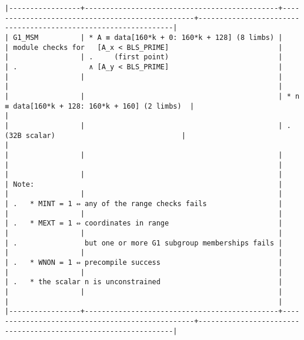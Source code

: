 \documentclass[varwidth=\maxdimen,margin=0.5cm,multi={verbatim}]{standalone}
\begin{document}
\begin{verbatim}
|-----------------+----------------------------------------------+-------------------------------------------------+----------------------------------------------------------------|
| G1_MSM          | * A ≡ data[160*k + 0: 160*k + 128] (8 limbs) |                                                 | module checks for   [A_x < BLS_PRIME]                          |
|                 | .     (first point)                          |                                                 | .                 ∧ [A_y < BLS_PRIME]                          |
|                 |                                              |                                                 |                                                                |
|                 |                                              | * n ≡ data[160*k + 128: 160*k + 160] (2 limbs)  |                                                                |
|                 |                                              | .     (32B scalar)                              |                                                                |
|                 |                                              |                                                 |                                                                |
|                 |                                              |                                                 | Note:                                                          |
|                 |                                              |                                                 | .   * MINT = 1 ⇔ any of the range checks fails                 |
|                 |                                              |                                                 | .   * MEXT = 1 ⇔ coordinates in range                          |
|                 |                                              |                                                 | .                but one or more G1 subgroup memberships fails |
|                 |                                              |                                                 | .   * WNON = 1 ⇔ precompile success                            |
|                 |                                              |                                                 | .   * the scalar n is unconstrained                            |
|                 |                                              |                                                 |                                                                |
|-----------------+----------------------------------------------+-------------------------------------------------+----------------------------------------------------------------|

\end{verbatim}
\end{document}

